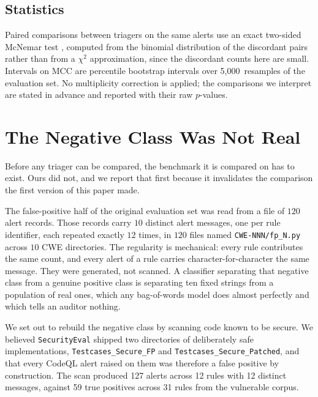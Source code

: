 \documentclass[journal]{IEEEtran}
\providecommand{\citep}[1]{\cite{#1}}
\theoremstyle{definition}
\newcommand{\RNtp}{59}
\newcommand{\RNfp}{127}
\newcommand{\RNrulesFp}{12}
\newcommand{\RNmsgFp}{12}
\newcommand{\RNrulesTp}{31}
\newcommand{\RBoot}{5{,}000}
\begin{document}
\subsection{Statistics}
Paired comparisons between triagers on the same alerts use an exact two-sided
McNemar test \citep{mcnemar1947}, computed from the binomial distribution of the
discordant pairs rather than from a $\chi^2$ approximation, since the discordant
counts here are small. Intervals on MCC are percentile bootstrap intervals over
\RBoot\ resamples of the evaluation set. No multiplicity correction is applied;
the comparisons we interpret are stated in advance and reported with their raw
$p$-values.

\section{The Negative Class Was Not Real}
\label{sec:fabricated}

Before any triager can be compared, the benchmark it is compared on has to
exist. Ours did not, and we report that first because it invalidates the
comparison the first version of this paper made.

The false-positive half of the original evaluation set was read from a file of
$120$ alert records. Those records carry $10$ distinct alert messages, one per
rule identifier, each repeated exactly $12$ times, in $120$ files named
\texttt{CWE-\allowbreak{}NNN/\allowbreak{}fp\_\allowbreak{}N.\allowbreak{}py} across $10$ CWE directories. The regularity is
mechanical: every rule contributes the same count, and every alert of a rule
carries character-for-character the same message. They were generated, not
scanned. A classifier separating that negative class from a genuine positive
class is separating ten fixed strings from a population of real ones, which any
bag-of-words model does almost perfectly and which tells an auditor nothing.

We set out to rebuild the negative class by scanning code known to be secure.
We believed \texttt{SecurityEval} shipped two directories of deliberately safe
implementations, \texttt{Testcases\_\allowbreak{}Secure\_\allowbreak{}FP} and
\texttt{Testcases\_\allowbreak{}Secure\_\allowbreak{}Patched}, and that every CodeQL alert raised on them
was therefore a false positive by construction. The scan produced \RNfp{} alerts
across \RNrulesFp{} rules with \RNmsgFp{} distinct messages, against \RNtp{}
true positives across \RNrulesTp{} rules from the vulnerable corpus.
\end{document}
